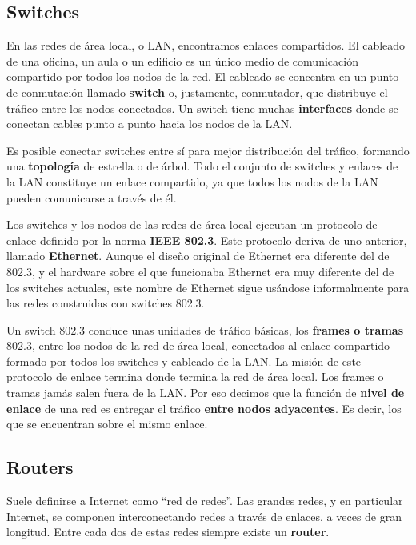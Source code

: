 \documentclass[spanish,A4,]{article}
\begin{document}
\subsection{Switches}\label{switches}

En las redes de área local, o LAN, encontramos enlaces compartidos. El
cableado de una oficina, un aula o un edificio es un único medio de
comunicación compartido por todos los nodos de la red. El cableado se
concentra en un punto de conmutación llamado \textbf{switch} o,
justamente, conmutador, que distribuye el tráfico entre los nodos
conectados. Un switch tiene muchas \textbf{interfaces} donde se conectan
cables punto a punto hacia los nodos de la LAN.

Es posible conectar switches entre sí para mejor distribución del
tráfico, formando una \textbf{topología} de estrella o de árbol. Todo el
conjunto de switches y enlaces de la LAN constituye un enlace
compartido, ya que todos los nodos de la LAN pueden comunicarse a través
de él.

Los switches y los nodos de las redes de área local ejecutan un
protocolo de enlace definido por la norma \textbf{IEEE 802.3}. Este
protocolo deriva de uno anterior, llamado \textbf{Ethernet}. Aunque el
diseño original de Ethernet era diferente del de 802.3, y el hardware
sobre el que funcionaba Ethernet era muy diferente del de los switches
actuales, este nombre de Ethernet sigue usándose informalmente para las
redes construidas con switches 802.3.

Un switch 802.3 conduce unas unidades de tráfico básicas, los
\textbf{frames o tramas} 802.3, entre los nodos de la red de área local,
conectados al enlace compartido formado por todos los switches y
cableado de la LAN. La misión de este protocolo de enlace termina donde
termina la red de área local. Los frames o tramas jamás salen fuera de
la LAN. Por eso decimos que la función de \textbf{nivel de enlace} de
una red es entregar el tráfico \textbf{entre nodos adyacentes}. Es
decir, los que se encuentran sobre el mismo enlace.

\subsection{Routers}\label{routers}

Suele definirse a Internet como ``red de redes''. Las grandes redes, y
en particular Internet, se componen interconectando redes a través de
enlaces, a veces de gran longitud. Entre cada dos de estas redes siempre
existe un \textbf{router}.
\end{document}
